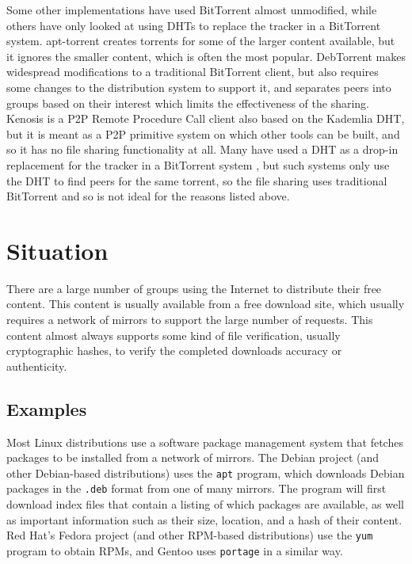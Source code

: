 \documentclass[conference]{IEEEtran}
\begin{document}
Some other implementations have used BitTorrent almost unmodified,
while others have only looked at using DHTs to replace the tracker
in a BitTorrent system. apt-torrent \cite{apttorrent} creates
torrents for some of the larger content available, but it ignores
the smaller content, which is often the most popular.
DebTorrent \cite{debtorrent} makes widespread modifications to a
traditional BitTorrent client, but also requires some changes to the
distribution system to support it, and separates peers into groups
based on their interest which limits the effectiveness of the
sharing. Kenosis \cite{kenosis} is a P2P Remote Procedure Call
client also based on the Kademlia DHT, but it is meant as a P2P
primitive system on which other tools can be built, and so it has no
file sharing functionality at all. Many have used a DHT as a drop-in
replacement for the tracker in a BitTorrent system
\cite{bittorrent-dht, azureus-dht}, but such systems only use the
DHT to find peers for the same torrent, so the file sharing uses
traditional BitTorrent and so is not ideal for the reasons listed
above.


\section{Situation}
\label{situation}

There are a large number of groups using the Internet to distribute
their free content. This content is usually available from a free
download site, which usually requires a network of mirrors to
support the large number of requests. This content almost always
supports some kind of file verification, usually cryptographic
hashes, to verify the completed downloads accuracy or authenticity.

\subsection{Examples}
\label{examples}

Most Linux distributions use a software package management system
that fetches packages to be installed from a network of mirrors. The
Debian project \cite{debian} (and other Debian-based distributions)
uses the \texttt{apt} program, which downloads Debian packages in
the \texttt{.deb} format from one of many mirrors. The program will
first download index files that contain a listing of which packages
are available, as well as important information such as their size,
location, and a hash of their content. Red Hat's Fedora project
\cite{fedora} (and other RPM-based distributions) use the
\texttt{yum} program to obtain RPMs, and Gentoo \cite{gentoo} uses
\texttt{portage} in a similar way.
\end{document}

